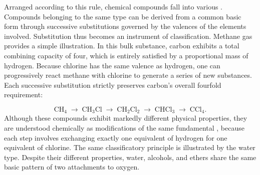 \documentclass[submitted,12pt]{article}
\renewcommand{\SF}[2]{\citep[#1/#2]{Cassirer1910}}
\begin{document}
Arranged according to this rule, chemical compounds fall into various   \SF{281}{211--12}. Compounds belonging to the same type can be derived from a common basic form through successive substitutions governed by the valences of the elements involved. Substitution thus becomes an instrument of classification. Methane gas provides a simple illustration. In this bulk substance, carbon exhibits a total combining capacity of four, which is entirely satisfied by a proportional mass of hydrogen. Because chlorine has the same valence as hydrogen, one can progressively react methane with chlorine to generate a series of new substances. Each successive substitution strictly preserves carbon's overall fourfold requirement: 

\[
\mathrm{CH}_4
\;\longrightarrow\;
\mathrm{CH}_3\mathrm{Cl}
\;\longrightarrow\;
\mathrm{CH}_2\mathrm{Cl}_2
\;\longrightarrow\;
\mathrm{CHCl}_3
\;\longrightarrow\;
\mathrm{CCl}_4.
\]
%
Although these compounds exhibit markedly different physical properties, they are understood chemically as modifications of the same fundamental , because each step involves exchanging exactly one equivalent of hydrogen for one equivalent of chlorine. The same classificatory principle is illustrated by the water type. Despite their different properties, water, alcohols, and ethers share the same basic pattern of two attachments to oxygen.
\end{document}
